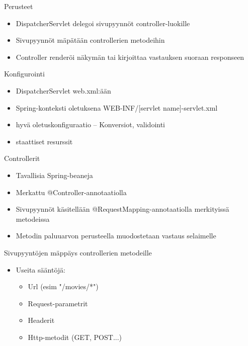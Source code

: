 \documentclass[hyperref={pdfauthor=\AUTHOR},14pt]{beamer}
\author{\AUTHOR}
\title[\TITLE]{\TITLE}
\date{\DATE}
\begin{document}
\begin{frame}[plain]
\titlepage
\end{frame}

\begin{frame}[t, fragile]{Perusteet}
\begin{itemize}
\item DispatcherServlet delegoi sivupyynnöt controller-luokille
\item Sivupyynnöt mäpätään controllerien metodeihin
\item Controller renderöi näkymän tai kirjoittaa vastauksen suoraan responseen
\end{itemize}
\end{frame}

\begin{frame}[t, fragile]{Konfigurointi}
\begin{itemize}
\item DispatcherServlet web.xml:ään
\item Spring-konteksti oletuksena WEB-INF/[servlet name]-servlet.xml
\item <mvc:annotationDriven> hyvä oletuskonfiguraatio
-- Konversiot, validointi
\item <mvc:resources> staattiset resurssit
\end{itemize}
\end{frame}

\begin{frame}[t, fragile]{Controllerit}
\begin{itemize}
\item Tavallisia Spring-beaneja
\item Merkattu @Controller-annotaatiolla
\item Sivupyynnöt käsitellään @RequestMapping-annotaatiolla merkityissä metodeissa
\item Metodin paluuarvon perusteella muodostetaan vastaus selaimelle
\end{itemize}
\end{frame}
\begin{frame}[t, fragile]{Sivupyyntöjen mäppäys controllerien metodeille}
\begin{itemize}
\item@RequestMapping-annotaatiolla luokka- ja metodi-tasolla
\item Useita sääntöjä:
\begin{itemize}
\item Url (esim "/movies/*")
\item Request-parametrit
\item Headerit
\item Http-metodit (GET, POST...)
\end{itemize}
\end{itemize}
\end{frame}
\end{document}
